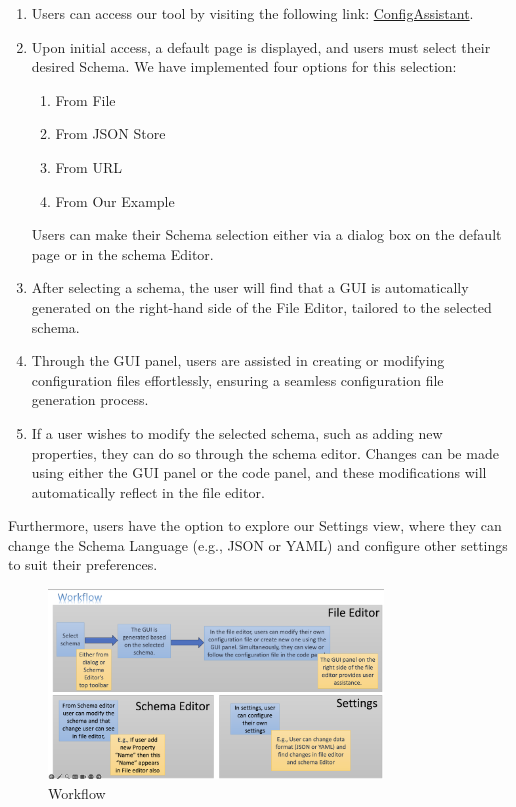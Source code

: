 \begin{enumerate}
    \item Users can access our tool by visiting the following link: \href{https://paulbredl.github.io/config-assistant/}{ConfigAssistant}.
    \item Upon initial access, a default page is displayed, and users must select their desired Schema. 
    We have implemented four options for this selection:
    \begin{enumerate}
        \item From File
        \item From JSON Store
        \item From URL
        \item From Our Example
    \end{enumerate}
    Users can make their Schema selection either via a dialog box on the default page or in the schema Editor.
    \item After selecting a schema, the user will find that a GUI is automatically generated on the right-hand side of the File Editor, tailored to the selected schema.
    \item Through the GUI panel, users are assisted in creating or modifying configuration files effortlessly, ensuring a seamless configuration file generation process.
    \item If a user wishes to modify the selected schema, such as adding new properties, they can do so through the schema editor. 
    Changes can be made using either the GUI panel or the code panel, and these modifications will automatically reflect in the file editor.
\end{enumerate}

Furthermore, users have the option to explore our Settings view, where they can change the Schema Language (e.g., JSON or YAML) and configure other settings to suit their preferences.

\begin{figure}[!htb]
    \begin{minipage}[t]{0.5\textwidth}
        \includegraphics[width=3.5in]{figures/workflow}
        \caption{Workflow}
    \end{minipage}\label{fig:workflow}
\end{figure}

